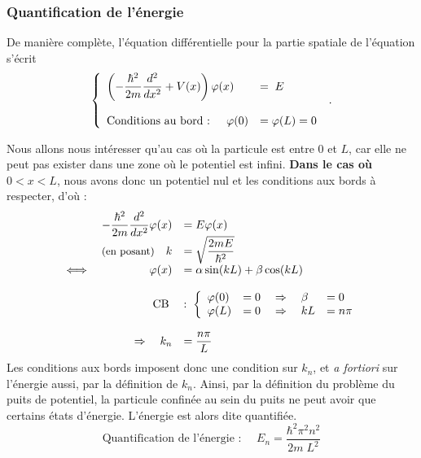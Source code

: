 \documentclass{book}
\begin{document}
\subsubsection{Quantification de l'énergie}
De manière complète, l'équation différentielle pour la partie spatiale de l'équation s'écrit 
$$\left \{ \begin{array}{ll}
  \left(-\dfrac{\hbar ^2}{2m} \dfrac{ d ^2}{d x^2 }  + V(x)\right) \varphi(x) \; &= \; E \\ \strut \\
  \text{Conditions au bord : } \quad \varphi(0) &= \varphi(L) = 0
  \end{array} \right. \; . $$


Nous allons nous intéresser qu'au cas où la particule est entre $0$ et $L$, car elle ne peut pas exister dans une zone où le potentiel est infini. \textbf{Dans le cas où} $0<x<L$, nous avons donc un potentiel nul et les conditions aux bords à respecter, d'où :
\begin{equation}
\begin{array}{lrl}
& -\dfrac{\hbar ^2}{2m} \dfrac{ d ^2}{d x^2 } \varphi(x) &= E \varphi (x) \\
&\text{\small (en posant)} \quad k &= \sqrt{\dfrac{2mE}{\hbar ^2}} \\
\iff & \varphi(x) &= \alpha \sin(kL) + \beta\cos(kL) \\ \strut \\
&\text{CB} \;  &:  \; \left\{ \begin{array}{lll}
\varphi(0) &= 0 \quad \Rightarrow \quad \beta &= 0 \\
\varphi(L) &= 0 \quad \Rightarrow \quad kL &= n\pi \\
\end{array}\right. \\ \strut \\
&\Rightarrow \quad k_n &= \dfrac{n\pi}{L}
\end{array}
\end{equation}
Les conditions aux bords imposent donc une condition sur $k_n$, et \textit{a fortiori} sur l'énergie aussi, par la définition de $k_n$. Ainsi, par la définition du problème du puits de potentiel, la particule confinée au sein du puits ne peut avoir que certains états d'énergie. L'énergie est alors dite quantifiée.
\begin{equation}\label{eq:quantification_energie}
\boxed{\text{Quantification de l'énergie : } \quad E_n = \dfrac{\hbar ^2 \pi ^2 n ^2}{2m \; L^2}}
\end{equation}
\end{document}
